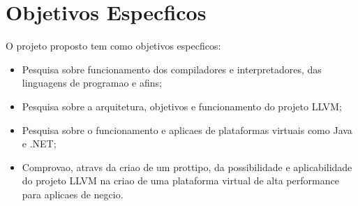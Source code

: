 \section{Objetivos Espec\ih ficos}

\label{pro:objetivos-especificos}

O projeto proposto tem como objetivos espec\ih ficos:
\begin{itemize}
  \item Pesquisa sobre funcionamento dos compiladores e interpretadores, das linguagens de programa\ca o e afins;
  \item Pesquisa sobre a arquitetura, objetivos e funcionamento do projeto LLVM;
  \item Pesquisa sobre o funcionamento e aplica\co es de plataformas virtuais como Java e .NET;
  \item Comprova\ca o, atrav\eh s da cria\ca o de um prot\oh tipo, da possibilidade e aplicabilidade do projeto LLVM na cria\ca o de uma plataforma virtual de alta performance para aplica\co es de neg\oh cio.
\end{itemize}
